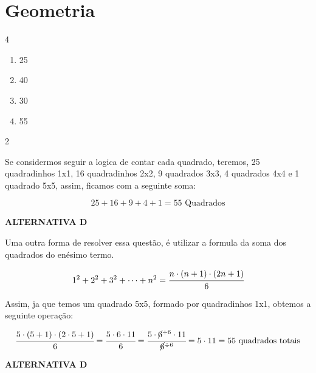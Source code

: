 \section{Geometria}



\begin{multicols}{4}
    \begin{enumerate}[label=\alph*)]
        \item 25
        \item 40
        \item 30
        \item 55
    \end{enumerate}
\end{multicols}

\begin{solucoes}{2}
    \solucao 

    Se considermos seguir a logica de contar cada quadrado, teremos, 25 quadradinhos 1x1, 16 quadradinhos 2x2, 9 quadrados 3x3, 4 quadrados 4x4 e 1 quadrado 5x5, assim, ficamos com a seguinte soma:

    $$25 + 16 + 9 + 4 + 1 = 55\,\, \text{Quadrados}$$

    \textbf{ALTERNATIVA D}

    \solucao

    Uma outra forma de resolver essa questão, é utilizar a formula da soma dos quadrados do enésimo termo.

    $$1^{2} + 2^{2} + 3^{2} + \cdots + n^{2} = \cfrac{n\cdot(n+1)\cdot(2n+1)}{6}$$

    Assim, ja que temos um quadrado 5x5, formado por quadradinhos 1x1, obtemos a seguinte operação:

    $$\cfrac{5\cdot(5+1)\cdot(2\cdot5+1)}{6} = \cfrac{5\cdot6\cdot11}{6} = \cfrac{5\cdot\cancel{6}^{\div 6}\cdot11}{\cancel{6}^{\div 6}} = 5\cdot11= 55 \,\, \text{quadrados totais}$$

    \textbf{ALTERNATIVA D}
\end{solucoes}